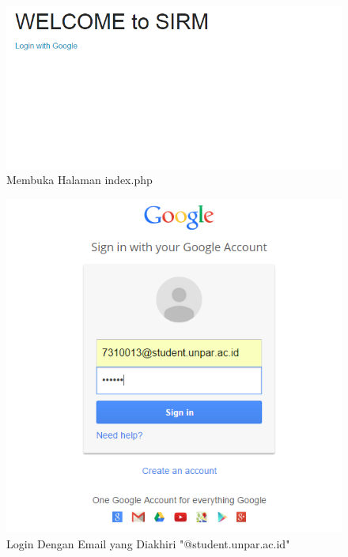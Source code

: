 \begin{figure}[H]
\centering
\includegraphics[scale=1]{Gambar/pengujian1.png}
\caption[Membuka Halaman index.php]{Membuka Halaman index.php} 
\label{fig:membukahalamanindex}
\end{figure}

\begin{figure}[H]
\centering
\includegraphics[scale=1]{Gambar/pengujian2.png}
\caption[Login Dengan Email yang Diakhiri "@student.unpar.ac.id"]{Login Dengan Email yang Diakhiri "@student.unpar.ac.id"} 
\label{fig:logindenganstudent}
\end{figure}

